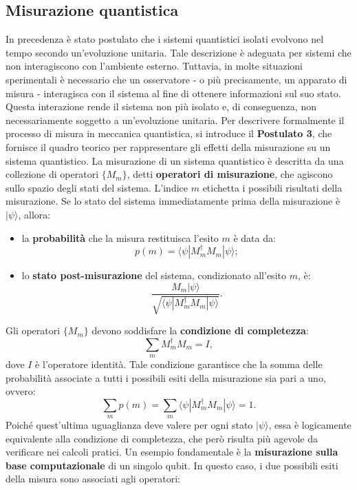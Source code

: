 \documentclass[a4paper,12pt]{report}
\theoremstyle{plain}
\begin{document}
\subsection{Misurazione quantistica}
In precedenza è stato postulato che i sistemi quantistici isolati evolvono nel tempo secondo un'evoluzione unitaria. Tale descrizione è adeguata per sistemi che non interagiscono con l'ambiente esterno. Tuttavia, in molte situazioni sperimentali è necessario che un osservatore - o più precisamente, un apparato di misura - interagisca con il sistema al fine di ottenere informazioni sul suo stato. Questa interazione rende il sistema non più isolato e, di conseguenza, non necessariamente soggetto a un'evoluzione unitaria.
Per descrivere formalmente il processo di misura in meccanica quantistica, si introduce il \textbf{Postulato 3}, che fornisce il quadro teorico per rappresentare gli effetti della misurazione su un sistema quantistico.
La misurazione di un sistema quantistico è descritta da una collezione di operatori \( \{M_m\} \), detti \textbf{operatori di misurazione}, che agiscono sullo spazio degli stati del sistema. L'indice \( m \) etichetta i possibili risultati della misurazione. Se lo stato del sistema immediatamente prima della misurazione è \( |\psi\rangle \), allora:
\begin{itemize}
    \item la \textbf{probabilità} che la misura restituisca l'esito \( m \) è data da:
    \[ p(m) = \langle \psi | M_m^\dagger M_m | \psi \rangle; \]

    \item lo \textbf{stato post-misurazione} del sistema, condizionato all'esito \( m \), è:
    \[ \frac{M_m |\psi\rangle}{\sqrt{\langle \psi | M_m^\dagger M_m | \psi \rangle}}. \]
\end{itemize}
Gli operatori \( \{M_m\} \) devono soddisfare la \textbf{condizione di completezza}:
\[ \sum_m M_m^\dagger M_m = I, \]
dove \( I \) è l'operatore identità. Tale condizione garantisce che la somma delle probabilità associate a tutti i possibili esiti della misurazione sia pari a uno, ovvero:
\[ \sum_m p(m) = \sum_m \langle \psi | M_m^\dagger M_m | \psi \rangle = 1. \]
Poiché quest'ultima uguaglianza deve valere per ogni stato \( |\psi\rangle \), essa è logicamente equivalente alla condizione di completezza, che però risulta più agevole da verificare nei calcoli pratici.
Un esempio fondamentale è la \textbf{misurazione sulla base computazionale} di un singolo qubit. In questo caso, i due possibili esiti della misura sono associati agli operatori:
\end{document}

